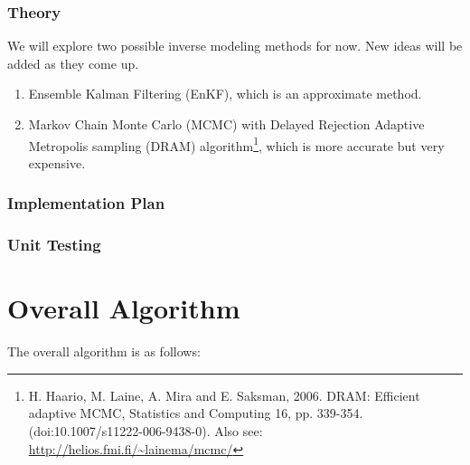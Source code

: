 \documentclass[paper = letter, fontsize = 11pt]{scrartcl} %
\begin{document}
\subsubsection{Theory}
We will explore two possible inverse modeling methods for now. New ideas will be added as they come up.
\begin{enumerate}
\item Ensemble Kalman Filtering (EnKF), which is an approximate method.
\item Markov Chain Monte Carlo (MCMC) with Delayed Rejection Adaptive Metropolis sampling (DRAM)
  algorithm\footnote{H. Haario, M. Laine, A. Mira and E. Saksman, 2006. DRAM: Efficient adaptive
    MCMC, Statistics and Computing 16, pp. 339-354. (doi:10.1007/s11222-006-9438-0).  Also see:
    \url{http://helios.fmi.fi/~lainema/mcmc/}}, which is more accurate but very expensive.
\end{enumerate}

\subsubsection{Implementation Plan}



\subsubsection{Unit Testing}





\section{Overall Algorithm}

The overall algorithm is as follows:
\end{document}
